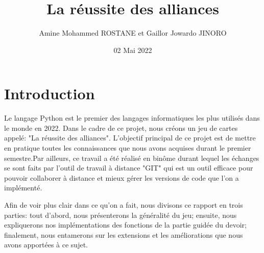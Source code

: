 \documentclass{article}
\title{La réussite des alliances}
\author{Amine Mohammed ROSTANE et Gaillor Jowardo JINORO}
\date{02 Mai 2022}
\begin{document}
\maketitle
\tableofcontents

\section{Introduction}

\hspace{\parindent} Le langage Python est le premier des langages informatiques les plus utilisés dans le monde en 2022. Dans le cadre de ce projet, nous créons un jeu de cartes appelé: "La réussite des alliances". L'objectif principal de ce projet est de mettre en pratique toutes les connaissances que nous avons acquises durant le premier semestre.Par ailleurs, ce travail a été réalisé en binôme durant lequel les échanges se sont faits par l'outil de travail à distance "GIT" qui  est un outil efficace pour pouvoir collaborer à distance et mieux gérer les versions de code que l'on a implémenté.
\par Afin de voir plus clair dans ce qu'on a fait, nous divisons ce rapport en trois parties: tout d'abord, nous présenterons la généralité du jeu; ensuite, nous expliquerons nos implémentations des fonctions de la partie guidée du devoir; finalement, nous entamerons sur les extensions et les améliorations que nous avons apportées à ce sujet.




	






\end{document}
